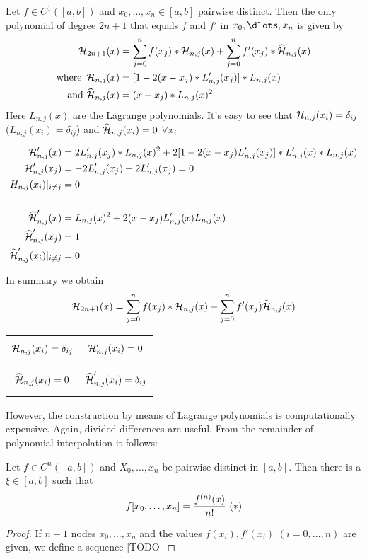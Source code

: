 \begin{theorem}
    Let $f \in C^1([a,b])$ and $x_0, \ldots, x_n \in [a,b]$ pairwise distinct.
    Then the only polynomial of degree $2n+1$ that equals $f$ and $f'$ in $x_0, \dlots, x_n$ is given by
    \begin{align*}
        \operatorname{\mathcal{H}}_{2n+1}(x) &= \sum_{j=0}^{n} f(x_j) * \operatorname{\mathcal{H}}_{n,j}(x) + \sum_{j=0}^{n} f'(x_j) * \widehat{\operatorname{\mathcal{H}}}_{n,j}(x)\\
        \text{where } \operatorname{\mathcal{H}}_{n,j}(x) &= [1-2(x-x_j) * L'_{n,j}(x_j)]*L_{n,j}(x)\\
        \text{and } \widehat{\operatorname{\mathcal{H}}}_{n,j}(x) &= (x-x_j)*L_{n,j}(x)^2
    \end{align*}
    Here $L_{n,j}(x)$ are the Lagrange polynomials.
    It's easy to see that $\operatorname{\mathcal{H}}_{n,j}(x_i) = \delta_{ij}$ ($L_{n,j}(x_i) = \delta_{ij}$)
    and $\widehat{\operatorname{\mathcal{H}}}_{n,j}(x_i) = 0$ $\forall x_i$

    \begin{align*}
        \operatorname{\mathcal{H}}_{n,j}'(x) &= 2 L'_{n,j}(x_j)*L_{n,j}(x)^2 + 2[1-2(x-x_j)L_{n,j}'(x_j)]*L_{n,j}'(x)*L_{n,j}(x)\\
        \operatorname{\mathcal{H}}_{n,j}'(x_j) &= -2L_{n,j}'(x_j)+2L_{n,j}'(x_j) = 0\\
        H_{n,j}(x_i) |_{i \neq j} &= 0\\
        \\
        \widehat{\operatorname{\mathcal{H}}}_{n,j}'(x)&=L_{n,j}(x)^2+2(x-x_j)L_{n,j}'(x)L_{n,j}(x)\\
        \widehat{\operatorname{\mathcal{H}}}_{n,j}'(x_j)&= 1\\
        \widehat{\operatorname{\mathcal{H}}}_{n,j}'(x_i) |_{i \neq j} &= 0
    \end{align*}
\end{theorem}
In summary we obtain
\begin{align*}
    \operatorname{\mathcal{H}}_{2n+1}(x) = \sum_{j=0}^{n} f(x_j)*\operatorname{\mathcal{H}}_{n,j}(x)+ \sum_{j=0}^{n} f'(x_j) \widehat{\operatorname{\mathcal{H}}}_{n,j}(x)
\end{align*}
\begin{center}
    \begin{tabular}{c c}
        \[ \operatorname{\mathcal{H}}_{n,j}(x_i) = \delta_{ij}\] & \[\operatorname{\mathcal{H}}_{n,j}'(x_i) = 0\]\\
        \[ \widehat{\operatorname{\mathcal{H}}}_{n,j}(x_i) = 0\] & \[ \widehat{\operatorname{\mathcal{H}}}_{n,j}'(x_i) = \delta_{ij}\]
    \end{tabular}
\end{center}
However, the construction by means of Lagrange polynomials is computationally expensive.
Again, divided differences are useful.
From the remainder of polynomial interpolation it follows:
\begin{lemma}
    Let $f \in C^n([a,b])$ and $X_0, \ldots, x_n$ be pairwise distinct in $[a,b]$.
    Then there is a $\xi \in [a,b]$ such that
    \begin{equation*}
        f[x_0,\ldots, x_n] = \frac{f^{(n)}(x)}{n!} \text{ (\textasteriskcentered)}
    \end{equation*}
\end{lemma}
\begin{proof}
    If $n+1$ nodes $x_0, \ldots, x_n$ and the values $f(x_i), f'(x_i)$ $(i=0, \ldots, n)$ are given, we define a sequence [TODO]
\end{proof}

